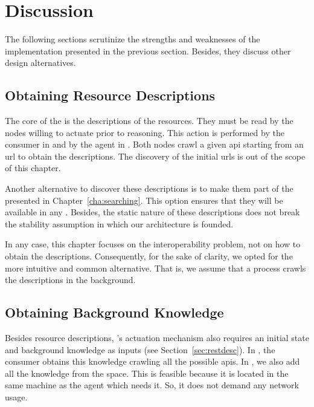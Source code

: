 \section{Discussion}
\label{sec:actuation_discussion}

The following sections scrutinize the strengths and weaknesses of the implementation presented in the previous section.
Besides, they discuss other design alternatives. %

\subsection{Obtaining Resource Descriptions}

The core of the \restActuation{} is the descriptions of the resources.
They must be read by the nodes willing to actuate prior to reasoning. %
This action is performed by the consumer in \implRest{} and by the agent in \implMix{}.
Both nodes crawl a given \ac{api} starting from an \ac{url} to obtain the descriptions.
The discovery of the initial \acp{url} is out of the scope of this chapter.


Another alternative to discover these descriptions is to make them part of the \clues{} presented in Chapter~\ref{cha:searching}.
This option ensures that they will be available in any \consumer{}.
Besides, the static nature of these descriptions does not break the \clues{} stability assumption in which our architecture is founded. %


In any case, this chapter focuses on the interoperability problem, not on how to obtain the descriptions.
Consequently, for the sake of clarity, we opted for the more intuitive and common alternative. %
That is, we assume that a process crawls the descriptions in the background.



\subsection{Obtaining Background Knowledge}

Besides resource descriptions, \citeauthor{verborgh_ijcs_2014}'s actuation mechanism also requires an initial state and background knowledge as inputs (see Section~\ref{sec:restdesc}).
In \implRest{}, the consumer obtains this knowledge crawling all the possible \acsp{api}.
In \implMix{}, we also add all the knowledge from the space.
This is feasible because it is located in the same machine as the agent which needs it.
So, it does not demand any network usage. %


